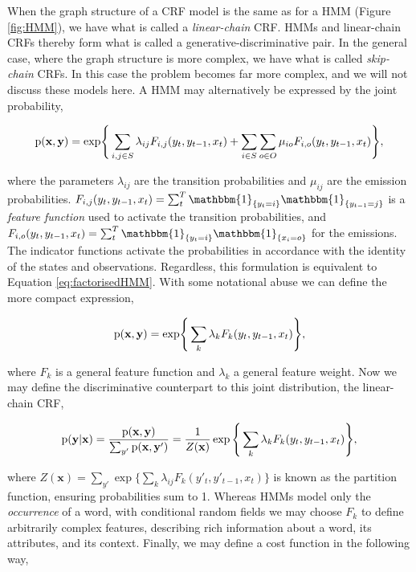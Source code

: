 When the graph structure of a CRF model is the same as for a HMM (Figure \ref{fig:HMM}), we have what is called a \emph{linear-chain} CRF. HMMs and linear-chain CRFs thereby form what is called a generative-discriminative pair. In the general case, where the graph structure is more complex, we have what is called \emph{skip-chain} CRFs. In this case the problem becomes far more complex, and we will not discuss these models here. A HMM may alternatively be expressed by the joint probability,

\begin{equation}
\text{p}(\textbf{x}, \textbf{y}) = \text{exp} \Bigg\{
\sum_{i, j \in S}{
\lambda_{ij}F_{i,j}(y_t, y_{t-1}, x_t)
}
+
\sum_{i \in S}\sum_{o \in O}{
\mu_{io}F_{i,o}(y_t, y_{t-1}, x_t)
}
\Bigg\},
\label{eq:jointcrf}
\end{equation}

where the parameters $\lambda_{ij}$ are the transition probabilities and $\mu_{ij}$ are the emission probabilities. $F_{i,j}(y_t, y_{t-1}, x_t) = \sum_t^T\mathbbm{1}_{\{y_t = i\}}\mathbbm{1}_{\{y_{t-1} = j\}}$ is a \emph{feature function} used to activate the transition probabilities, and $F_{i,o}(y_t, y_{t-1}, x_t) = \sum_t^T\mathbbm{1}_{\{y_t = i\}}\mathbbm{1}_{\{x_{i} = o\}}$ for the emissions. The indicator functions activate the probabilities in accordance with the identity of the states and observations. Regardless, this formulation is equivalent to Equation \ref{eq:factorisedHMM}. With some notational abuse we can define the more compact expression,

\begin{equation}
\text{p}(\textbf{x}, \textbf{y}) = \text{exp} \Bigg\{\sum_k{
\lambda_{k}F_{k}(y_t, y_{t-1}, x_t)
}\Bigg\},
\label{eq:jointcrfcompact}
\end{equation}

where $F_k$ is a general feature function and $\lambda_k$ a general feature weight. Now we may define the discriminative counterpart to this joint distribution, the linear-chain CRF,

\begin{equation}
\text{p}(\textbf{y}|\textbf{x}) = \frac{\text{p}(\textbf{x}, \textbf{y})}{\sum_{y'}{\text{p}(\textbf{x}, \textbf{y}')}} = \frac{1}{Z(\mathbf{x})}\exp \Bigg\{\sum_k{
\lambda_{k}F_{k}(y_t, y_{t-1}, x_t)
}\Bigg\},
\end{equation}

where $Z(\mathbf{x}) = \sum_{y'}\exp \Big\{\sum_k{\lambda_{ij}F_{k}(y'_t, y'_{t-1}, x_t)}\Big\}$ is known as the partition function, ensuring probabilities sum to 1. Whereas HMMs model only the \emph{occurrence} of a word, with conditional random fields we may choose $F_k$ to define arbitrarily complex features, describing rich information about a word, its attributes, and its context. Finally, we may define a cost function in the following way,

